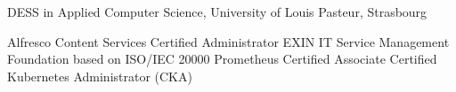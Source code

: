 %
%
%


\begin{scholarship}
					{DESS in Applied Computer Science, University of Louis Pasteur, Strasbourg}
\end{scholarship}

\begin{scholarship}
					{Alfresco Content Services Certified Administrator}
					{EXIN IT Service Management Foundation based on ISO/IEC 20000}
					{Prometheus Certified Associate}
					{Certified Kubernetes Administrator (CKA)}
\end{scholarship}
